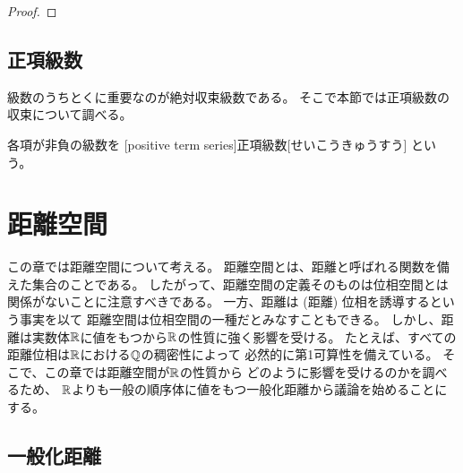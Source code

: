 \documentclass[report]{jlreq}
\begin{document}
\begin{proof}
    \TODO{}
\end{proof}

%
\section{正項級数}

級数のうちとくに重要なのが絶対収束級数である。
そこで本節では正項級数の収束について調べる。

\begin{definition}[正項級数]
    各項が非負の級数を
    [positive term series]{正項級数}[せいこうきゅうすう]
    という。
\end{definition}





%
\chapter{距離空間}

この章では距離空間について考える。
距離空間とは、距離と呼ばれる関数を備えた集合のことである。
したがって、距離空間の定義そのものは位相空間とは関係がないことに注意すべきである。
一方、距離は (距離) 位相を誘導するという事実を以て
距離空間は位相空間の一種だとみなすこともできる。
しかし、距離は実数体$\mathbb{R}$に値をもつから$\mathbb{R}$の性質に強く影響を受ける。
たとえば、すべての距離位相は$\mathbb{R}$における$\mathbb{Q}$の稠密性によって
必然的に第1可算性を備えている。
そこで、この章では距離空間が$\mathbb{R}$の性質から
どのように影響を受けるのかを調べるため、
$\mathbb{R}$よりも一般の順序体に値をもつ一般化距離から議論を始めることにする。

%
\section{一般化距離}
\end{document}
